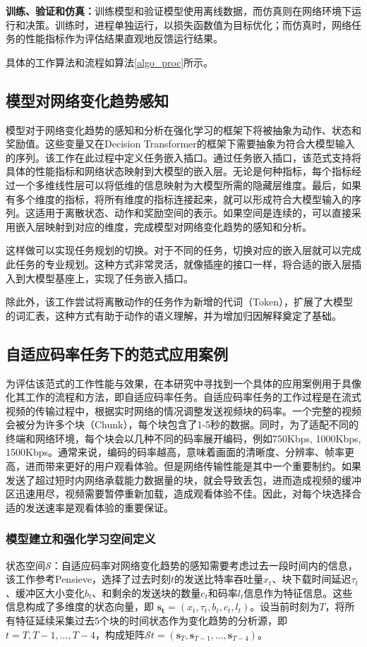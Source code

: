 \textbf{训练、验证和仿真：}训练模型和验证模型使用离线数据，而仿真则在网络环境下运行和决策。训练时，进程单独运行，以损失函数值为目标优化；而仿真时，网络任务的性能指标作为评估结果直观地反馈运行结果。

具体的工作算法和流程如算法\ref{algo_proc}所示。


\subsection{模型对网络变化趋势感知}
模型对于网络变化趋势的感知和分析在强化学习的框架下将被抽象为动作、状态和奖励值。这些变量又在Decision Transformer的框架下需要抽象为符合大模型输入的序列。该工作在此过程中定义任务嵌入插口。通过任务嵌入插口，该范式支持将具体的性能指标和网络状态映射到大模型的嵌入层。无论是何种指标，每个指标经过一个多维线性层可以将低维的信息映射为大模型所需的隐藏层维度。最后，如果有多个维度的指标，将所有维度的指标连接起来，就可以形成符合大模型输入的序列。这适用于离散状态、动作和奖励空间的表示。如果空间是连续的，可以直接采用嵌入层映射到对应的维度，完成模型对网络变化趋势的感知和分析。

这样做可以实现任务规划的切换。对于不同的任务，切换对应的嵌入层就可以完成此任务的专业规划。这种方式非常灵活，就像插座的接口一样，将合适的嵌入层插入到大模型基座上，实现了任务嵌入插口。

除此外，该工作尝试将离散动作的任务作为新增的代词（Token），扩展了大模型的词汇表，这种方式有助于动作的语义理解，并为增加归因解释奠定了基础。

\subsection{自适应码率任务下的范式应用案例}
为评估该范式的工作性能与效果，在本研究中寻找到一个具体的应用案例用于具像化其工作的流程和方法，即自适应码率任务。自适应码率任务的工作过程是在流式视频的传输过程中，根据实时网络的情况调整发送视频块的码率。一个完整的视频会被分为许多个块（Chunk），每个块包含了1-5秒的数据。同时，为了适配不同的终端和网络环境，每个块会以几种不同的码率展开编码，例如750Kbps, 1000Kbps, 1500Kbps。通常来说，编码的码率越高，意味着画面的清晰度、分辨率、帧率更高，进而带来更好的用户观看体验。但是网络传输性能是其中一个重要制约。如果发送了超过短时内网络承载能力数据量的块，就会导致丢包，进而造成视频的缓冲区迅速用尽，视频需要暂停重新加载，造成观看体验不佳。因此，对每个块选择合适的发送速率是观看体验的重要保证。

\subsubsection{模型建立和强化学习空间定义}
状态空间$\mathcal{S}$：自适应码率对网络变化趋势的感知需要考虑过去一段时间内的信息，该工作参考Pensieve\cite{mao2017neural}，选择了过去时刻$t$的发送比特率吞吐量$x_t$、块下载时间延迟$\tau_t$、缓冲区大小变化$b_t$、和剩余的发送块的数量$c_t$和码率$l_t$信息作为特征信息。这些信息构成了多维度的状态向量，即 $\boldsymbol{s_t} = (x_t, \tau_t, b_t, c_t, l_t)$。设当前时刻为$T$，将所有特征延续采集过去5个块的时间状态作为变化趋势的分析源，即$t = T, T-1, ..., T-4$，构成矩阵$\mathcal{S}t = (\boldsymbol{s}_T, \boldsymbol{s}_{T-1}, ..., \boldsymbol{s}_{T-4})$。


